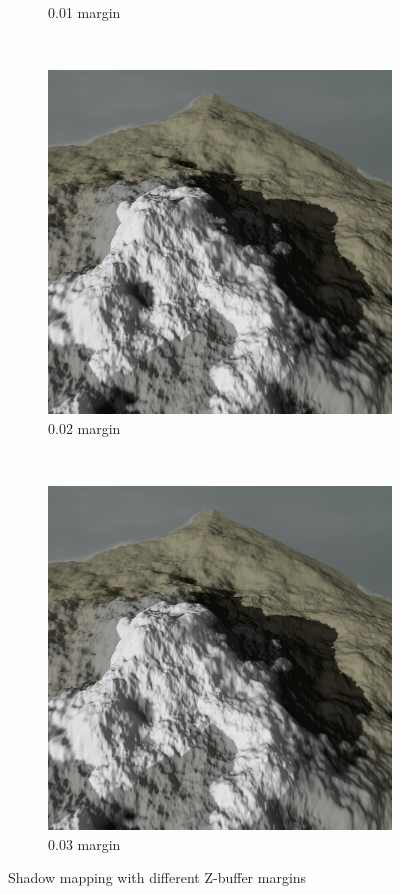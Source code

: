 \documentclass{article}
\begin{document}
\begin{figure}[H]
\begin{subfigure}[b]{0.45\textwidth}
        \caption{0.01 margin}
        \label{fig:shadowMargin1}
    \end{subfigure}
    ~
    \begin{subfigure}[b]{0.45\textwidth}
        \centering
        \includegraphics[scale=0.25]{shadowMargin2}
        \caption{0.02 margin}
        \label{fig:shadowMargin2}
    \end{subfigure}
    ~
    \begin{subfigure}[b]{0.45\textwidth}
        \centering
        \includegraphics[scale=0.25]{shadowMargin3}
        \caption{0.03 margin}
        \label{fig:shadowMargin3}
    \end{subfigure}
    \caption{Shadow mapping with different Z-buffer margins}
    \label{fig:shadowMapMargin}
\end{figure}
\end{document}
